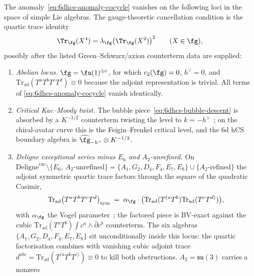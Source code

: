 \begin{corollary}
\label{cor:6dhcs-deligne-cancellation}
The anomaly~\eqref{eq:6dhcs-anomaly-cocycle} vanishes on the
following loci in the space of simple Lie algebras.  The
gauge-theoretic cancellation condition is the quartic trace identity
\begin{equation}\label{eq:6dhcs-quartic-trace-identity}
 \Tr_{\fg}(X^4)
 =
 \lambda_{\fg}\bigl(\Tr_{\fg}(X^2)\bigr)^2
 \qquad(X\in\fg),
\end{equation}
possibly after the listed Green--Schwarz/axion counterterm data are
supplied:
\begin{enumerate}[label=\textup{(\alph*)}]
\item \emph{Abelian locus.} $\fg=\fu(1)^{\oplus r}$, for which
 $c_2(\fg)=0$, $h^\vee=0$, and
 $\mathrm{Tr}_{\mathrm{ad}}(T^aT^bT^cT^d)\equiv 0$ because the
 adjoint representation is trivial. All terms of
 \eqref{eq:6dhcs-anomaly-cocycle} vanish identically.
\item \emph{Critical Kac--Moody twist.} The bubble
 piece~\eqref{eq:6dhcs-bubble-descent} is absorbed by a $K^{-1/2}$
 counterterm twisting the level to $k=-h^\vee$~\cite{Costello2013};
 on the chiral-avatar curve this is the Feigin--Frenkel critical
 level, and the 6d hCS boundary algebra is
 $\widehat\fg_{-h^\vee}\otimes K^{-1/2}$.
\item \emph{Deligne exceptional series minus $E_6$ and
 $A_2$-unrefined.} On
 $\mathrm{Deligne}^{\mathrm{exc}}\setminus\{E_6,\,A_2\text{-unrefined}\}
 =\{A_1,G_2,D_4,F_4,E_7,E_8\}\cup\{A_2\text{-refined}\}$ the
 adjoint symmetric quartic trace factors through the square of
 the quadratic Casimir,
 \begin{equation}\label{eq:6dhcs-deligne-factor}
 \mathrm{Tr}_{\mathrm{ad}}\bigl(T^aT^bT^cT^d\bigr)_{\mathrm{sym}}
 \;=\;
 \alpha_\fg\cdot\bigl(\mathrm{Tr}_{\mathrm{ad}}(T^{(a}T^b)
 \mathrm{Tr}_{\mathrm{ad}}(T^cT^{d)})\bigr),
 \end{equation}
 with $\alpha_\fg$ the Vogel parameter~\cite{Deligne1996};
 the factored piece is BV-exact against the cubic
 $\mathrm{Tr}_{\mathrm{ad}}(T^aT^b)\int c^a\wedge\bar\partial c^b$
 counterterm. The six algebras $\{A_1,G_2,D_4,F_4,E_7,E_8\}$
 sit unconditionally inside this locus: the quartic factorisation
 combines with vanishing cubic adjoint trace
 $d^{abc}=\mathrm{Tr}_{\mathrm{ad}}(T^{(a}T^bT^{c)})\equiv 0$ to
 kill both obstructions. $A_2=\mathfrak{su}(3)$ carries a nonzero

\end{enumerate}
\end{corollary}

